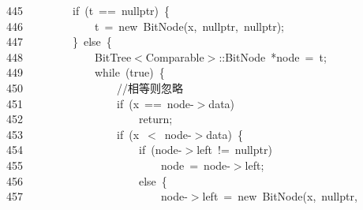 \documentclass[11pt,a4paper]{ctexart}
\newcommand{\hlstd}[1]{\textcolor[rgb]{0.2,0.2,0.2}{#1}}
\newcommand{\hlslc}[1]{\textcolor[rgb]{0.59,0.59,0.59}{#1}}
\newcommand{\hlopt}[1]{\textcolor[rgb]{0.2,0.2,0.2}{#1}}
\newcommand{\hllin}[1]{\textcolor[rgb]{0.59,0.59,0.59}{#1}}
\newcommand{\hlkwa}[1]{\textcolor[rgb]{0.23,0.42,0.78}{#1}}
\newcommand{\hlkwc}[1]{\textcolor[rgb]{0,0.63,0.31}{#1}}
\newcommand{\hlkwd}[1]{\textcolor[rgb]{0.78,0.23,0.41}{#1}}
\begin{document}
\hllin{445\ }\hlstd{}\hlstd{\ \ \ \ \ \ \ \ }\hlstd{}\hlkwa{if\ }\hlstd{}\hlopt{(}\hlstd{t\ }\hlopt{==\ }\hlstd{}\hlkwc{nullptr}\hlstd{}\hlopt{)\ \{}\\
\hllin{446\ }\hlstd{}\hlstd{\ \ \ \ \ \ \ \ \ \ \ \ }\hlstd{t\ }\hlopt{=\ }\hlstd{}\hlkwa{new\ }\hlstd{}\hlkwd{BitNode}\hlstd{}\hlopt{(}\hlstd{x}\hlopt{,\ }\hlstd{}\hlkwc{nullptr}\hlstd{}\hlopt{,\ }\hlstd{}\hlkwc{nullptr}\hlstd{}\hlopt{);}\\
\hllin{447\ }\hlstd{}\hlstd{\ \ \ \ \ \ \ \ }\hlstd{}\hlopt{\}\ }\hlstd{}\hlkwa{else\ }\hlstd{}\hlopt{\{}\\
\hllin{448\ }\hlstd{}\hlstd{\ \ \ \ \ \ \ \ \ \ \ \ }\hlstd{BitTree}\hlopt{$<$}\hlstd{Comparable}\hlopt{$>$::}\hlstd{BitNode\ }\hlopt{{*}}\hlstd{node\ }\hlopt{=\ }\hlstd{t}\hlopt{;}\\
\hllin{449\ }\hlstd{}\hlstd{\ \ \ \ \ \ \ \ \ \ \ \ }\hlstd{}\hlkwa{while\ }\hlstd{}\hlopt{(}\hlstd{}\hlkwa{true}\hlstd{}\hlopt{)\ \{}\\
\hllin{450\ }\hlstd{}\hlstd{\ \ \ \ \ \ \ \ \ \ \ \ \ \ \ \ }\hlstd{}\hlslc{//相等则忽略}\\
\hllin{451\ }\hlstd{}\hlstd{\ \ \ \ \ \ \ \ \ \ \ \ \ \ \ \ }\hlstd{}\hlkwa{if\ }\hlstd{}\hlopt{(}\hlstd{x\ }\hlopt{==\ }\hlstd{node}\hlopt{{-}$>$}\hlstd{data}\hlopt{)}\\
\hllin{452\ }\hlstd{}\hlstd{\ \ \ \ \ \ \ \ \ \ \ \ \ \ \ \ \ \ \ \ }\hlstd{}\hlkwa{return}\hlstd{}\hlopt{;}\\
\hllin{453\ }\hlstd{}\hlstd{\ \ \ \ \ \ \ \ \ \ \ \ \ \ \ \ }\hlstd{}\hlkwa{if\ }\hlstd{}\hlopt{(}\hlstd{x\ }\hlopt{$<$\ }\hlstd{node}\hlopt{{-}$>$}\hlstd{data}\hlopt{)\ \{}\\
\hllin{454\ }\hlstd{}\hlstd{\ \ \ \ \ \ \ \ \ \ \ \ \ \ \ \ \ \ \ \ }\hlstd{}\hlkwa{if\ }\hlstd{}\hlopt{(}\hlstd{node}\hlopt{{-}$>$}\hlstd{left\ }\hlopt{!=\ }\hlstd{}\hlkwc{nullptr}\hlstd{}\hlopt{)}\\
\hllin{455\ }\hlstd{}\hlstd{\ \ \ \ \ \ \ \ \ \ \ \ \ \ \ \ \ \ \ \ \ \ \ \ }\hlstd{node\ }\hlopt{=\ }\hlstd{node}\hlopt{{-}$>$}\hlstd{left}\hlopt{;}\\
\hllin{456\ }\hlstd{}\hlstd{\ \ \ \ \ \ \ \ \ \ \ \ \ \ \ \ \ \ \ \ }\hlstd{}\hlkwa{else\ }\hlstd{}\hlopt{\{}\\
\hllin{457\ }\hlstd{}\hlstd{\ \ \ \ \ \ \ \ \ \ \ \ \ \ \ \ \ \ \ \ \ \ \ \ }\hlstd{node}\hlopt{{-}$>$}\hlstd{left\ }\hlopt{=\ }\hlstd{}\hlkwa{new\ }\hlstd{}\hlkwd{BitNode}\hlstd{}\hlopt{(}\hlstd{x}\hlopt{,\ }\hlstd{}\hlkwc{nullptr}\hlstd{}\hlopt{,\ }\Righttorque\\
\end{document}
